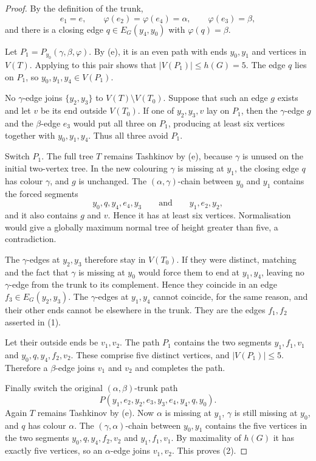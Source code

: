\documentclass[11pt]{article}
\theoremstyle{definition}
\newcommand{\set}[1]{\{#1\}}
\newcommand{\comp}{\mathbin{\setminus}}
\begin{document}
\begin{proof}
By the definition of the trunk,
\[
 e_1=e,
 \qquad
 \varphi(e_2)=\varphi(e_4)=\alpha,
 \qquad
 \varphi(e_3)=\beta,
\]
and there is a closing edge $q\in E_G(y_4,y_0)$ with
$\varphi(q)=\beta$.

Let $P_1=P_{y_0}(\gamma,\beta,\varphi)$. By
(e), it is an even path with ends $y_0,y_1$ and
vertices in $V(T)$. Applying  to this pair shows that
$|V(P_1)|\le h(G)=5$. The edge $q$ lies on $P_1$, so
$y_0,y_1,y_4\in V(P_1)$.

No $\gamma$-edge joins $\set{y_2,y_3}$ to
$V(T)\comp V(T_0)$. Suppose that such an edge $g$ exists and let $v$ be
its end outside $V(T_0)$. If one of $y_2,y_3,v$ lay on $P_1$, then the
$\gamma$-edge $g$ and the $\beta$-edge $e_3$ would put all three on
$P_1$, producing at least six vertices together with $y_0,y_1,y_4$.
Thus all three avoid $P_1$.

Switch $P_1$. The full tree $T$ remains Tashkinov by
(e), because $\gamma$ is unused on the initial
two-vertex tree. In the new colouring $\gamma$ is missing at $y_1$, the
closing edge $q$ has colour $\gamma$, and $g$ is unchanged. The
$(\alpha,\gamma)$-chain between $y_0$ and $y_1$ contains the forced
segments
\[
 y_0,q,y_4,e_4,y_3
 \qquad\text{and}\qquad
 y_1,e_2,y_2,
\]
and it also contains $g$ and $v$. Hence it has at least six vertices.
Normalisation would give a globally maximum normal tree of height greater
than five, a contradiction.

The $\gamma$-edges at $y_2,y_3$ therefore stay in $V(T_0)$. If they were
distinct, matching and the fact that $\gamma$ is missing at $y_0$ would
force them to end at $y_1,y_4$, leaving no $\gamma$-edge from the trunk to
its complement. Hence they coincide in an edge
$f_3\in E_G(y_2,y_3)$. The $\gamma$-edges at $y_1,y_4$ cannot coincide,
for the same reason, and their other ends cannot be elsewhere in the trunk.
They are the edges $f_1,f_2$ asserted in (1).

Let their outside ends be $v_1,v_2$. The path $P_1$ contains the two
segments $y_1,f_1,v_1$ and $y_0,q,y_4,f_2,v_2$. These comprise five
distinct vertices, and $|V(P_1)|\le5$. Therefore a $\beta$-edge joins
$v_1$ and $v_2$ and completes the path.

Finally switch the original $(\alpha,\beta)$-trunk path
\[
 P(y_1,e_2,y_2,e_3,y_3,e_4,y_4,q,y_0).
\]
Again $T$ remains Tashkinov by (e). Now
$\alpha$ is missing at $y_1$, $\gamma$ is still missing at $y_0$, and
$q$ has colour $\alpha$. The $(\gamma,\alpha)$-chain between $y_0,y_1$
contains the five vertices in the two segments
$y_0,q,y_4,f_2,v_2$ and $y_1,f_1,v_1$. By maximality of $h(G)$ it has
exactly five vertices, so an $\alpha$-edge joins $v_1,v_2$. This proves
(2).
\end{proof}
\end{document}
